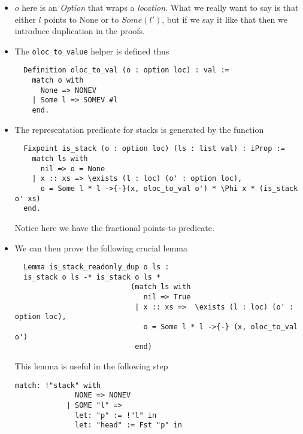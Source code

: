 \begin{itemize}

\item $o$ here is an \emph{Option} that wraps a \emph{location}. What we really want to say is that either $l$ points to None or to $Some(l')$, but if we say it like that then we introduce duplication in the proofs. 

\item The \texttt{oloc\_to\_value} helper is defined thus

\begin{verbatim}
  Definition oloc_to_val (o : option loc) : val :=
    match o with
      None => NONEV
    | Some l => SOMEV #l
    end.
\end{verbatim}

\item The representation predicate for stacks is generated by the function

\begin{verbatim}
  Fixpoint is_stack (o : option loc) (ls : list val) : iProp :=
    match ls with
      nil => o = None
    | x :: xs => \exists (l : loc) (o' : option loc),
      o = Some l * l ->{-}(x, oloc_to_val o') * \Phi x * (is_stack o' xs)
  end.
\end{verbatim}


Notice here we have the fractional points-to predicate. 

\item We can then prove the following crucial lemma

\begin{verbatim}
  Lemma is_stack_readonly_dup o ls :
  is_stack o ls -* is_stack o ls *
                           (match ls with
                              nil => True
                            | x :: xs =>  \exists (l : loc) (o' : option loc),
                              o = Some l * l ->{-} (x, oloc_to_val o')
                            end)
\end{verbatim}

This lemma is useful in the following step
\begin{verbatim}
match: !"stack" with
              NONE => NONEV
            | SOME "l" =>
              let: "p" := !"l" in
              let: "head" := Fst "p" in
\end{verbatim}


\end{itemize}
